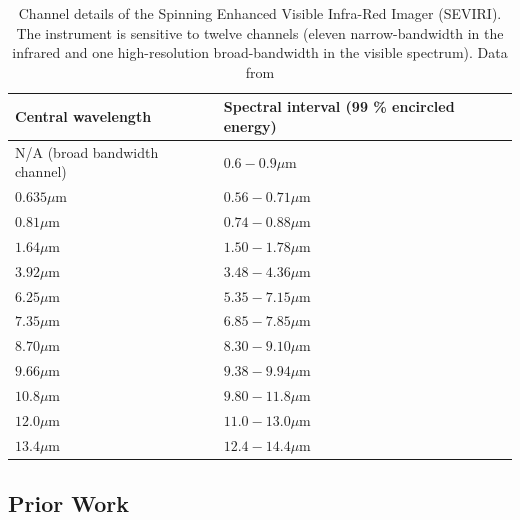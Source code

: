 \begin{table}[H]
\centering
\begin{tabular}{|l|l|}
\hline \textbf{Central wavelength} & \textbf{Spectral interval (99 \% encircled energy)} \\
\hline N/A (broad bandwidth channel) & $0.6-0.9 \mu \mathrm{m}$ \\
\hline $0.635 \mu \mathrm{m}$ & $0.56-0.71 \mu \mathrm{m}$ \\
\hline $0.81 \mu \mathrm{m}$ & $0.74-0.88 \mu \mathrm{m}$ \\
\hline $1.64 \mu \mathrm{m}$ & $1.50-1.78 \mu \mathrm{m}$ \\
\hline $3.92 \mu \mathrm{m}$ & $3.48-4.36 \mu \mathrm{m}$ \\
\hline $6.25 \mu \mathrm{m}$ & $5.35-7.15 \mu \mathrm{m}$ \\
\hline $7.35 \mu \mathrm{m}$ & $6.85-7.85 \mu \mathrm{m}$ \\
\hline $8.70 \mu \mathrm{m}$ & $8.30-9.10 \mu \mathrm{m}$ \\
\hline $9.66 \mu \mathrm{m}$ & $9.38-9.94 \mu \mathrm{m}$ \\
\hline $10.8 \mu \mathrm{m}$ & $9.80-11.8 \mu \mathrm{m}$ \\
\hline $12.0 \mu \mathrm{m}$ & $11.0-13.0 \mu \mathrm{m}$ \\
\hline $13.4 \mu \mathrm{m}$ & $12.4-14.4 \mu \mathrm{m}$ \\
\hline
\end{tabular}
\caption{\label{tab:Table1} Channel details of the Spinning Enhanced Visible Infra-Red Imager (SEVIRI). The instrument is sensitive to twelve channels (eleven narrow-bandwidth in the infrared and one high-resolution broad-bandwidth in the visible spectrum). Data from \cite{Table1}}
\end{table}



\subsection{Prior Work}\label{subsec1.3}


